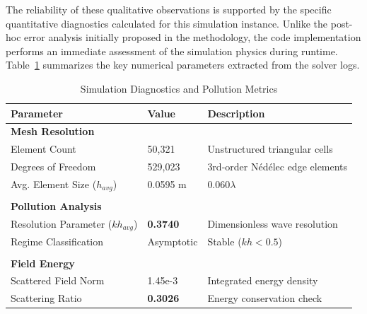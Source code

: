 \documentclass[class=report, crop=false]{standalone}
\begin{document}
The reliability of these qualitative observations is supported by the specific quantitative diagnostics calculated for this simulation instance. Unlike the post-hoc error analysis initially proposed in the methodology, the code implementation performs an immediate assessment of the simulation physics during runtime. Table~\ref{tab:solver_metrics} summarizes the key numerical parameters extracted from the solver logs.

\begin{table}[!htbp]
    \centering
    \caption{Simulation Diagnostics and Pollution Metrics}
    \label{tab:solver_metrics}
    \begin{tabular}{l l l}
        \hline
        \textbf{Parameter} & \textbf{Value} & \textbf{Description} \\
        \hline
        \multicolumn{3}{l}{\textbf{Mesh Resolution}} \\
        Element Count & 50,321 & Unstructured triangular cells \\
        Degrees of Freedom & 529,023 & 3rd-order N\'{e}d\'{e}lec edge elements \\
        Avg. Element Size ($h_{avg}$) & 0.0595 m & 0.060$\lambda$ \\
        & & \\
        \multicolumn{3}{l}{\textbf{Pollution Analysis}} \\
        Resolution Parameter ($kh_{avg}$) & \textbf{0.3740} & Dimensionless wave resolution \\
        Regime Classification & Asymptotic & Stable ($kh < 0.5$) \\
        & & \\
        \multicolumn{3}{l}{\textbf{Field Energy}} \\
        Scattered Field Norm & 1.45e-3 & Integrated energy density \\ %
        Scattering Ratio & \textbf{0.3026} & Energy conservation check \\
        \hline
    \end{tabular}
\end{table}
\end{document}

